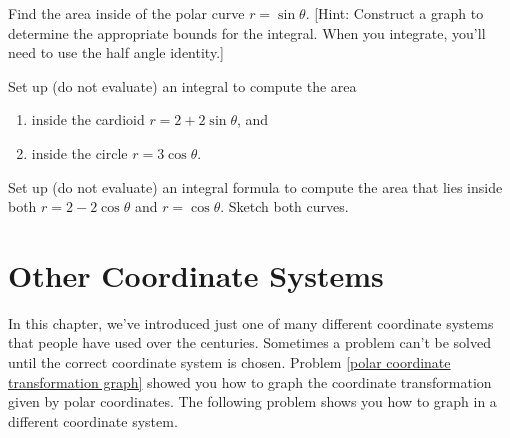 \begin{problem} 
%
Find the area inside of the polar curve $r=\sin\theta$. [Hint: Construct a graph to determine the appropriate bounds for the integral. When you integrate, you'll need to use the half angle identity.] 
\end{problem}


\begin{problem}
Set up (do not evaluate) an integral to compute the area 
\begin{enumerate}
\item inside the cardioid $r=2+2\sin\theta$, and 
\item inside the circle $r=3\cos\theta$.
\end{enumerate}
\end{problem}

\begin{problem}
Set up (do not evaluate) an integral formula to compute the area that lies inside both $r=2-2\cos\theta$ and $r=\cos\theta$. Sketch both curves. 
\end{problem}


\section{Other Coordinate Systems}
In this chapter, we've introduced just one of many different coordinate systems that people have used over the centuries. Sometimes a problem can't be solved until the correct coordinate system is chosen. Problem \ref{polar coordinate transformation graph} showed you how to graph the coordinate transformation given by polar coordinates.  The following problem shows you how to graph in a different coordinate system.


